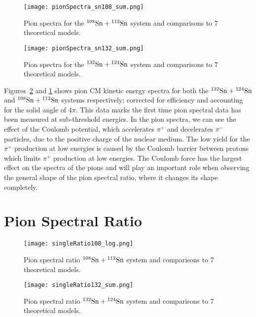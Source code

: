 \begin{figure}[!htb]
\centering
\texttt{[image: pionSpectra\_sn108\_sum.png]}
\caption{Pion spectra for the ${}^{108}\mathrm{Sn} + {}^{112}\mathrm{Sn}$ system and comparisons to 7 theoretical models. }
\label{fig:pionspectraSn108}
\end{figure}


\begin{figure}[!htb]
\centering
\texttt{[image: pionSpectra\_sn132\_sum.png]}
\caption{Pion spectra for the ${}^{132}\mathrm{Sn} + {}^{124}\mathrm{Sn}$ system and comparisons to 7 theoretical models. }
\label{fig:pionspectraSn132}
\end{figure}


Figures~\ref{fig:pionspectraSn132} and \ref{fig:pionspectraSn108} shows pion CM kinetic energy spectra for both the ${}^{132}\mathrm{Sn} + {}^{124}\mathrm{Sn}$ and ${}^{108}\mathrm{Sn} + {}^{112}\mathrm{Sn}$ systems respectively; corrected for efficiency and accounting for the solid angle of 4$\pi$. This data marks the first time pion spectral data has been measured at sub-threshold energies. In the pion spectra, we can see the effect of the Coulomb potential, which accelerates $\pi^+$ and decelerates $\pi^-$ particles, due to the positive charge of the nuclear medium. The low yield for the $\pi^+$ production at low energies is caused by the Coulomb barrier between protons which limits $\pi^+$ production at low energies. The Coulomb force has the largest effect on the spectra of the pions and will play an important role when observing the general shape of the pion spectral ratio, where it changes its shape completely. 



\section{Pion Spectral Ratio}

\begin{figure}[!htb]
\centering
\texttt{[image: singleRatio108\_log.png]}
\caption{Pion spectral ratio ${}^{108}\mathrm{Sn} + {}^{112}\mathrm{Sn}$ system and comparisons to 7 theoretical models.}
\label{fig:SRsn108}
\end{figure}

\begin{figure}[!htb]
\centering
\texttt{[image: singleRatio132\_sum.png]}
\caption{Pion spectral ratio ${}^{132}\mathrm{Sn} + {}^{124}\mathrm{Sn}$ system and comparisons to 7 theoretical models.}
\label{fig:SRsn132}
\end{figure}

